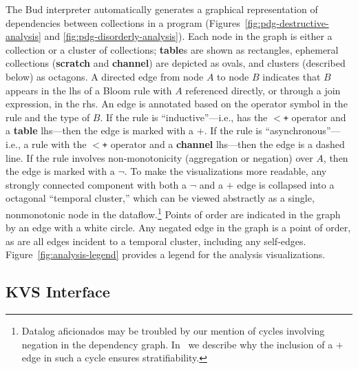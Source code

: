The Bud interpreter automatically generates a graphical
representation of dependencies between collections in a program
(Figures~\ref{fig:pdg-destructive-analysis} and \ref{fig:pdg-disorderly-analysis}).
Each node in the graph is either a collection or a cluster of collections; \textbf{table}s are shown as rectangles, ephemeral
collections (\textbf{scratch} and \textbf{channel}) are depicted as ovals, and clusters (described below) as octagons.  A
directed edge from node $A$ to node $B$ indicates that $B$ appears in the
lhs of a Bloom rule with $A$ referenced directly, or through a join expression,
in the rhs.  An edge is annotated based on the operator symbol in the rule and
the type of $B$.  If the rule is ``inductive''---i.e., has the \texttt{$<$+}
operator and a {\bf table} lhs---then the edge is marked with a $+$.  If the
rule is ``asynchronous''---i.e., a rule with the \texttt{$<$+} operator and a {\bf
channel} lhs---then the edge is a dashed line.  If the rule involves
non-monotonicity (aggregation or negation) over $A$, then the edge is marked with a $\lnot$.
To make the visualizations more readable, any strongly connected component with both a $\lnot$ and a $+$ edge is collapsed into a octagonal ``temporal cluster,'' 
which can be viewed abstractly as a single, nonmonotonic node in the 
dataflow.\footnote{Datalog aficionados may be troubled by our mention of cycles
involving negation in the dependency graph.  In~\cite{dedalus} we
describe why the inclusion of a $+$ edge in such a cycle ensures stratifiability.}
Points of order are indicated in the graph by an edge with a white circle.
 Any negated edge in the graph is a point of order, as are all edges incident to a temporal cluster, including any self-edges.  Figure~\ref{fig:analysis-legend} provides a legend for the analysis visualizations.



\subsection{KVS Interface}

